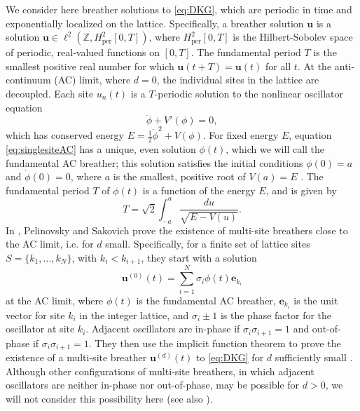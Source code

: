 \documentclass[12pt,reqno]{amsart}
\def\Z{{\mathbb Z}}
\def\per{\textrm{per}}
\newcommand{\evec}{\mathbf{e}}
\newcommand{\uvec}{\mathbf{u}}
\begin{document}
We consider here breather solutions to \cref{eq:DKG}, which are periodic in time and exponentially localized on the lattice. Specifically, a breather solution $\uvec$ is a solution $\uvec \in \ell^2(\Z, H^2_\per[0,T])$, where $H^2_\per[0,T]$ is the Hilbert-Sobolev space of periodic, real-valued functions on $[0,T]$. 
The fundamental period $T$ is the smallest positive real number for which $\uvec(t+T) = \uvec(t)$ for all $t$. At the anti-continuum (AC) limit, where $d = 0$, the individual sites in the lattice are decoupled. Each site $u_n(t)$ is a $T$-periodic solution to the nonlinear oscillator equation
\begin{equation}\label{eq:singlesiteAC}
\ddot{\phi} + V'(\phi) = 0,
\end{equation}
which has conserved energy $E = \frac{1}{2}\dot{\phi}^2 + V(\phi)$. For fixed energy $E$, equation \cref{eq:singlesiteAC} has a unique, even solution $\phi(t)$, which we will call the fundamental AC breather; this solution satisfies the initial conditions $\phi(0) = a$ and $\dot{\phi}(0) = 0$, where $a$ is the smallest, positive root of $V(a) = E$ \cite{Pelinovsky2012}. The fundamental period $T$ of $\phi(t)$ is a function of the energy $E$, and is given by
\begin{equation}
T = \sqrt{2}\int_{-a}^a \frac{du}{\sqrt{E - V(u)}}.
\end{equation}
In \cite{Pelinovsky2012}, Pelinovsky and Sakovich prove the existence of multi-site breathers close to the AC limit, i.e. for $d$ small. Specifically, for a finite set of lattice sites $S = \{ k_1, \dots, k_N \}$, with $k_i < k_{i+1}$, they start with a solution
\begin{equation}
\uvec^{(0)}(t) = \sum_{i=1}^N \sigma_i \phi(t) \evec_{k_i}
\end{equation}
at the AC limit, where $\phi(t)$ is the fundamental AC breather, $\evec_{k_i}$ is the unit vector for site $k_i$ in the integer lattice, and $\sigma_i \pm 1$ is the phase factor for the oscillator at site $k_i$. Adjacent oscillators are in-phase if $\sigma_i \sigma_{i+1} = 1$ and out-of-phase if $\sigma_i \sigma_{i+1} = 1$. They then use the implicit function theorem to prove the existence of a multi-site breather $\uvec^{(d)}(t)$ to \cref{eq:DKG} for $d$ sufficiently small \cite[Theorem 1]{Pelinovsky2012}. Although other configurations of multi-site breathers, in which adjacent oscillators are neither in-phase nor out-of-phase, may be possible for $d > 0$, we will not consider this possibility here (see also \cite[Remark 2]{Pelinovsky2012}).
\end{document}
